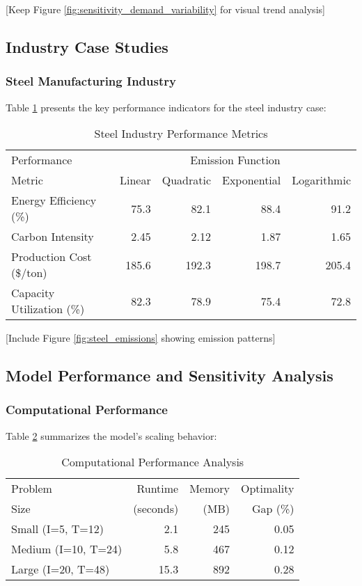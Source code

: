 \documentclass[final,3p,times,review,authoryear]{elsarticle}
\begin{document}
[Keep Figure \ref{fig:sensitivity_demand_variability} for visual trend analysis]

\subsection{Industry Case Studies}
\subsubsection{Steel Manufacturing Industry}
Table \ref{tab:steel_industry} presents the key performance indicators for the steel industry case:

\begin{table}[htbp]
    \centering
    \caption{Steel Industry Performance Metrics}
    \label{tab:steel_industry}
    \begin{tabular}{lrrrr}
        \toprule
        Performance & \multicolumn{4}{c}{Emission Function} \\
        \cmidrule{2-5}
        Metric & Linear & Quadratic & Exponential & Logarithmic \\
        \midrule
        Energy Efficiency (\%) & 75.3 & 82.1 & 88.4 & 91.2 \\
        Carbon Intensity & 2.45 & 2.12 & 1.87 & 1.65 \\
        Production Cost (\$/ton) & 185.6 & 192.3 & 198.7 & 205.4 \\
        Capacity Utilization (\%) & 82.3 & 78.9 & 75.4 & 72.8 \\
        \bottomrule
    \end{tabular}
\end{table}

[Include Figure \ref{fig:steel_emissions} showing emission patterns]

\subsection{Model Performance and Sensitivity Analysis}
\subsubsection{Computational Performance}
Table \ref{tab:computational_performance} summarizes the model's scaling behavior:

\begin{table}[htbp]
    \centering
    \caption{Computational Performance Analysis}
    \label{tab:computational_performance}
    \begin{tabular}{lrrr}
        \toprule
        Problem & Runtime & Memory & Optimality \\
        Size & (seconds) & (MB) & Gap (\%) \\
        \midrule
        Small (I=5, T=12) & 2.1 & 245 & 0.05 \\
        Medium (I=10, T=24) & 5.8 & 467 & 0.12 \\
        Large (I=20, T=48) & 15.3 & 892 & 0.28 \\
        \bottomrule
    \end{tabular}
\end{table}
\end{document}
